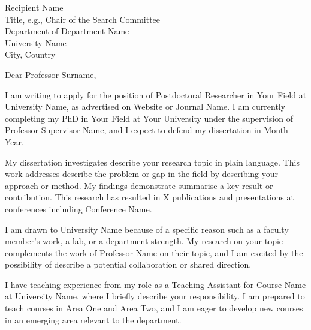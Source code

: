 

\begin{letter}{
  Recipient Name \\{}
  Title, e.g., Chair of the Search Committee \\{}
  Department of Department Name \\{}
  University Name \\{}
  City, Country
}

\date{\today}

\opening{Dear Professor Surname,}


I am writing to apply for the position of Postdoctoral Researcher in Your Field
at University Name, as advertised on Website or Journal Name. I am currently
completing my PhD in Your Field at Your University under the supervision of
Professor Supervisor Name, and I expect to defend my dissertation in Month Year.


My dissertation investigates describe your research topic in plain language.
This work addresses describe the problem or gap in the field by describing
your approach or method. My findings demonstrate summarise a key result or
contribution. This research has resulted in X publications and presentations
at conferences including Conference Name.


I am drawn to University Name because of a specific reason such as a faculty
member's work, a lab, or a department strength. My research on your topic
complements the work of Professor Name on their topic, and I am excited by
the possibility of describe a potential collaboration or shared direction.


I have teaching experience from my role as a Teaching Assistant for Course Name
at University Name, where I briefly describe your responsibility. I am prepared
to teach courses in Area One and Area Two, and I am eager to develop new courses
in an emerging area relevant to the department.



\end{letter}
